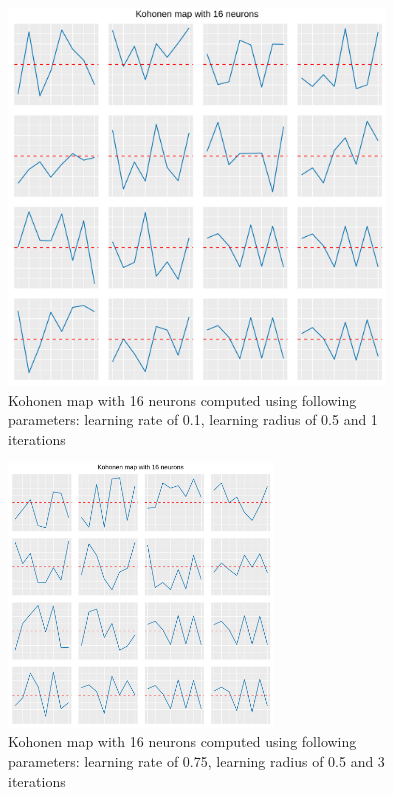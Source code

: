 \documentclass[11pt,a4paper]{article}
\begin{document}
    \begin{figure}[h!]
        \centering
        \includegraphics[height=10cm]{img/mutliple_graph_learn_rate_0_1_0_5_1.png}
        \caption{Kohonen map with 16 neurons computed using following parameters: learning rate of 0.1, learning radius of 0.5 and 1 iterations}
        \label{fig:mutliple_graph_learn_rate_0_1_0_5_1}
    \end{figure}
    \begin{figure}[h!]
        \centering
        \includegraphics[height=7cm]{img/mutliple_graph_learn_rate_0_75_0_5_3.png}
        \caption{Kohonen map with 16 neurons computed using following parameters: learning rate of 0.75, learning radius of 0.5 and 3 iterations}
        \label{fig:mutliple_graph_learn_rate_0_75_0_5_3}
    \end{figure}
\end{document}
